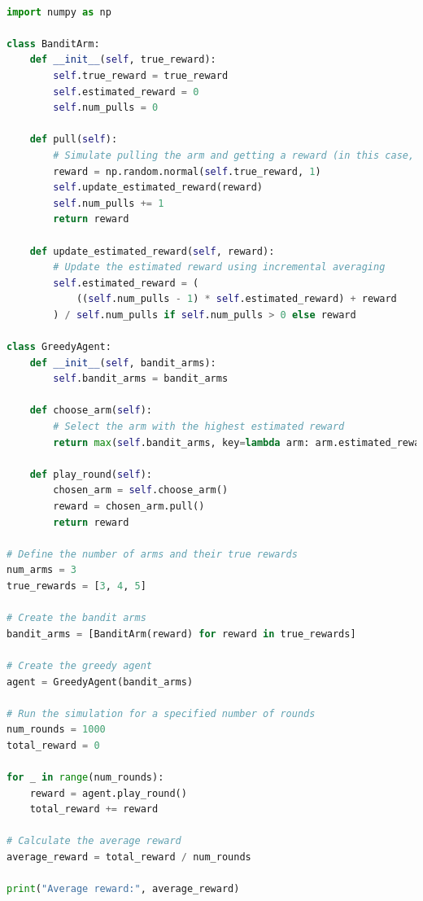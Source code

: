 \documentclass{article}
\begin{document}
\begin{lstlisting}[language = Python]
    
import numpy as np

class BanditArm:
    def __init__(self, true_reward):
        self.true_reward = true_reward
        self.estimated_reward = 0
        self.num_pulls = 0

    def pull(self):
        # Simulate pulling the arm and getting a reward (in this case, randomly generated)
        reward = np.random.normal(self.true_reward, 1)
        self.update_estimated_reward(reward)
        self.num_pulls += 1
        return reward

    def update_estimated_reward(self, reward):
        # Update the estimated reward using incremental averaging
        self.estimated_reward = (
            ((self.num_pulls - 1) * self.estimated_reward) + reward
        ) / self.num_pulls if self.num_pulls > 0 else reward

class GreedyAgent:
    def __init__(self, bandit_arms):
        self.bandit_arms = bandit_arms

    def choose_arm(self):
        # Select the arm with the highest estimated reward
        return max(self.bandit_arms, key=lambda arm: arm.estimated_reward)

    def play_round(self):
        chosen_arm = self.choose_arm()
        reward = chosen_arm.pull()
        return reward

# Define the number of arms and their true rewards
num_arms = 3
true_rewards = [3, 4, 5]

# Create the bandit arms
bandit_arms = [BanditArm(reward) for reward in true_rewards]

# Create the greedy agent
agent = GreedyAgent(bandit_arms)

# Run the simulation for a specified number of rounds
num_rounds = 1000
total_reward = 0

for _ in range(num_rounds):
    reward = agent.play_round()
    total_reward += reward

# Calculate the average reward
average_reward = total_reward / num_rounds

print("Average reward:", average_reward)
\end{lstlisting}
\end{document}
